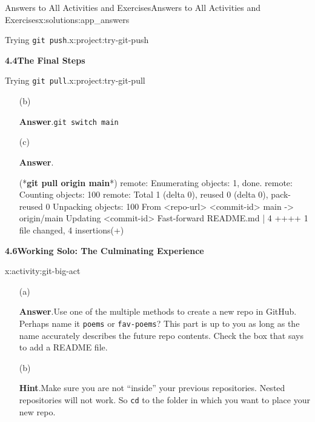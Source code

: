 \documentclass[oneside,10pt,]{book}
\newcommand{\blocktitlefont}{\relax}
\newcommand{\mono}[1]{\texttt{#1}}
\newcommand{\consoleinput}[1]{\textbf{#1}}
\begin{document}
\begin{solutions-chapter}{Answers to All Activities and Exercises}{}{Answers to All Activities and Exercises}{}{}{x:solutions:app_answers}
\begin{projectsolution}{4.7}{Trying \mono{git push}.}{x:project:try-git-push}
\begin{enumerate}[font=\bfseries,label=(\alph*),ref=\alph*]
\begin{enumerate}[font=\bfseries,label=(\roman*),ref=\theenumi.\roman*]
\end{enumerate}
\end{enumerate}
\end{projectsolution}%
\par\medskip
\noindent\textbf{\Large{}4.4\space\textperiodcentered\space{}The Final Steps}
\begin{projectsolution}{4.10}{Trying \mono{git pull}.}{x:project:try-git-pull}%
\begin{enumerate}[font=\bfseries,label=(\alph*),ref=\alph*]
\item[(b)]\par\smallskip%
\noindent\textbf{\blocktitlefont Answer}.\hypertarget{g:answer:idp616500920-back}{}\quad{}\mono{git switch main}%
\item[(c)]\par\smallskip%
\noindent\textbf{\blocktitlefont Answer}.\hypertarget{g:answer:idp616499896-back}{}\quad{}\begin{console}{0}{1}{0}
(*\consoleinput{git pull origin main}*)
remote: Enumerating objects: 1, done.
remote: Counting objects: 100%
remote: Total 1 (delta 0), reused 0 (delta 0), pack-reused 0
Unpacking objects: 100%
From <repo-url>
   <commit-id>  main       -> origin/main
Updating <commit-id>
Fast-forward
 README.md | 4 ++++
 1 file changed, 4 insertions(+)
\end{console}
\end{enumerate}
\end{projectsolution}%
\par\medskip
\noindent\textbf{\Large{}4.6\space\textperiodcentered\space{}Working Solo: The Culminating Experience}
\begin{activitysolution}{4.11}{}{x:activity:git-big-act}%
\begin{enumerate}[font=\bfseries,label=(\alph*),ref=\alph*]
\item[(a)]\par\smallskip%
\noindent\textbf{\blocktitlefont Answer}.\hypertarget{g:answer:idp616532280-back}{}\quad{}Use one of the multiple methods to create a new repo in GitHub. Perhaps name it \mono{poems} or \mono{fav-poems}? This part is up to you as long as the name accurately describes the future repo contents. Check the box that says to add a README file.%
\item[(b)]\par\smallskip%
\noindent\textbf{\blocktitlefont Hint}.\hypertarget{g:hint:idp616535480-back}{}\quad{}Make sure you are not ``inside'' your previous repositories. Nested repositories will not work. So \mono{cd} to the folder in which you want to place your new repo.%

\end{enumerate}
\end{activitysolution}
\end{solutions-chapter}
\end{document}
